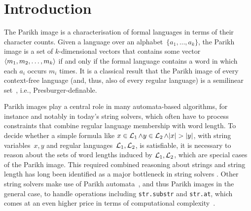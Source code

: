 \documentclass[acmsmall,review,anonymous,screen]{acmart}\settopmatter{printfolios=true,printccs=true,printacmref=true}
\theoremstyle{definition}
\begin{document}




\maketitle


\section{Introduction}

The Parikh image is a characterisation of formal languages in terms of
their character counts. Given a language over an
alphabet~$\{a_1, \ldots, a_k\}$, the Parikh image is a set of
$k$-dimensional vectors that contains some
vector~$\left\langle m_1, m_2, \ldots, m_k\right\rangle$ if and only if the
formal language contains a word in which each $a_i$ occurs $m_i$
times. It is a classical result that the Parikh image of every
context-free language (and, thus, also of every regular language) is a
semilinear set~\cite{parikh-theorem}, i.e., Presburger-definable.

Parikh images play a central role in many automata-based algorithms,
for instance and notably in today's string solvers, which often have
to process constraints that combine regular language membership with
word length. To decide whether a simple formula like
$x \in \operatorname{\mathcal{L}}_1 \wedge y \in \operatorname{\mathcal{L}}_2 \wedge |x| > |y|$,
with string variables~$x, y$ and regular
languages~$\operatorname{\mathcal{L}}_1, \operatorname{\mathcal{L}}_2$, is satisfiable, it is
necessary to reason about the sets of word lengths induced by
$\operatorname{\mathcal{L}}_1, \operatorname{\mathcal{L}}_2$, which are special cases of the Parikh
image.  This required combined reasoning about strings and string
length has long been identified as a major bottleneck in string
solvers
\cite{DBLP:conf/cav/AbdullaACHRRS15,length-aware-solver,approximate-parikh,DBLP:journals/corr/BerzishZG17}.
Other string solvers make use of Parikh automata~\cite{parikh-automata}, and thus
Parikh images in the general case, to handle operations including
\verb!str.substr!  and \verb!str.at!, which comes at an even higher
price in terms of computational complexity~\cite{ostrich-plus}.
\end{document}
